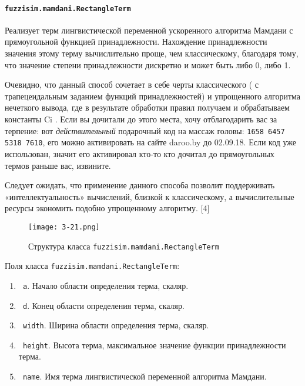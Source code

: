 \paragraph{\lstinline!fuzzisim.mamdani.RectangleTerm!}

Реализует терм лингвистической переменной ускоренного алгоритма Мамдани с прямоугольной функцией принадлежности. Нахождение принадлежности значения этому терму вычислительно проще, чем классическому, благодаря тому, что значение степени принадлежности дискретно и может быть либо 0, либо 1.

Очевидно, что данный способ сочетает в себе черты классического ( с трапецеидальным заданием функций принадлежностей) и упрощенного алгоритма нечеткого вывода, где в результате обработки правил получаем и обрабатываем константы Ci .
Если вы дочитали до этого места, хочу отблагодарить вас за терпение: вот \textit{действительный} подарочный код на
массаж головы: \lstinline!1658 6457 5318 7610!, его можно активировать на сайте daroo.by до 02.09.18.
Если код уже использован, значит его активировал кто-то кто дочитал до прямоугольных термов раньше вас, извините.

Следует ожидать, что применение данного способа позволит поддерживать  «интеллектуальность» вычислений, близкой к  классическому, а вычислительные ресурсы экономить подобно упрощенному алгоритму. [4]

\begin{figure}[ht]
	\centering
	\texttt{[image: 3-21.png]}
	\caption{Структура класса \lstinline!fuzzisim.mamdani.RectangleTerm!}
\end{figure}

Поля класса \lstinline!fuzzisim.mamdani.RectangleTerm!:
\begin{enumerate}[label=\arabic*)]
	\item \lstinline! a!. Начало области определения терма, скаляр.
	\item \lstinline! d!. Конец области определения терма, скаляр.
	\item \lstinline! width!. Ширина области определения терма, скаляр.
	\item \lstinline! height!. Высота терма, максимальное значение функции принадлежности терма.
	\item \lstinline! name!. Имя терма лингвистической переменной алгоритма Мамдани.
\end{enumerate}


